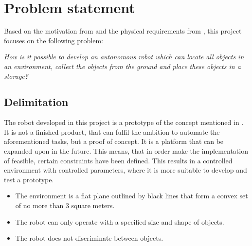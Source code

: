 \section{Problem statement} \label{sec:problem_statement}
Based on the motivation from  and the physical requirements from , this project focuses on the following problem:

\begin{center}
\textit{How is it possible to develop an autonomous robot which can locate all objects in an environment, collect the objects from the ground and place these objects in a storage?}
\end{center}

\subsection{Delimitation} \label{sec:delimitation}
The robot developed in this project is a prototype of the concept mentioned in . It is not a finished product, that can fulfil the ambition to automate the aforementioned tasks, but a proof of concept. It is a platform that can be expanded upon in the future. This means, that in order make the implementation of \projname{} feasible, certain constraints have been defined. This results in a controlled environment with controlled parameters, where it is more suitable to develop and test a prototype.

\begin{itemize}
\item The environment is a flat plane outlined by black lines that form a convex set of no more than 3 square meters.
\item The robot can only operate with a specified size and shape of objects.
\item The robot does not discriminate between objects.
\end{itemize}


